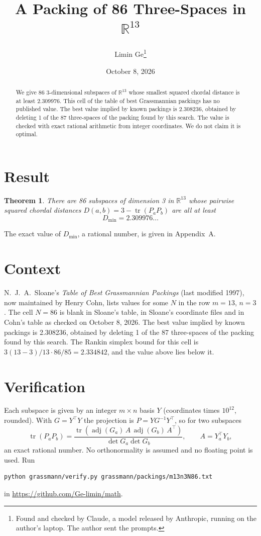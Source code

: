 \documentclass[11pt,a4paper]{article}
\title{A Packing of 86 Three-Spaces in $\mathbb{R}^{13}$}
\author{Limin Ge\thanks{Found and checked by Claude, a model released by Anthropic, running on the author's laptop. The author sent the prompts.}}
\date{October 8, 2026}
\newtheorem*{theorem}{Theorem}
\begin{document}
\maketitle
\begin{abstract}
We give 86 3-dimensional subspaces of $\mathbb{R}^{13}$ whose smallest squared chordal distance is at least 2.309976. This cell of the table of best Grassmannian packings has no published value. The best value implied by known packings is 2.308236, obtained by deleting 1 of the 87 three-spaces of the packing found by this search. The value is checked with exact rational arithmetic from integer coordinates. We do not claim it is optimal.
\end{abstract}

\section{Result}
\begin{theorem}
There are 86 subspaces of dimension 3 in $\mathbb{R}^{13}$ whose pairwise squared chordal distances $D(a,b) = 3 - \operatorname{tr}(P_aP_b)$ are all at least
\[ D_{\min} = 2.309976\ldots \]
\end{theorem}
The exact value of $D_{\min}$, a rational number, is given in Appendix~A.


\section{Context}
N.~J.~A.~Sloane's \emph{Table of Best Grassmannian Packings} (last modified 1997), now maintained by Henry Cohn, lists values for some $N$ in the row $m=13$, $n=3$. The cell $N=86$ is blank in Sloane's table, in Sloane's coordinate files and in Cohn's table as checked on October 8, 2026. The best value implied by known packings is 2.308236, obtained by deleting 1 of the 87 three-spaces of the packing found by this search. The Rankin simplex bound for this cell is $3(13-3)/13\cdot 86/85 = 2.334842$, and the value above lies below it.


\section{Verification}
Each subspace is given by an integer $m\times n$ basis $Y$ (coordinates times $10^{12}$, rounded). With $G=Y^\top Y$ the projection is $P=YG^{-1}Y^\top$, so for two subspaces
\[ \operatorname{tr}(P_aP_b)=\frac{\operatorname{tr}(\operatorname{adj}(G_a)\,A\,\operatorname{adj}(G_b)\,A^\top)}{\det G_a\det G_b},\qquad A=Y_a^\top Y_b, \]
an exact rational number. No orthonormality is assumed and no floating point is used. Run
\begin{verbatim}
python grassmann/verify.py grassmann/packings/m13n3N86.txt
\end{verbatim}
in \url{https://github.com/Ge-limin/math}.
\end{document}
